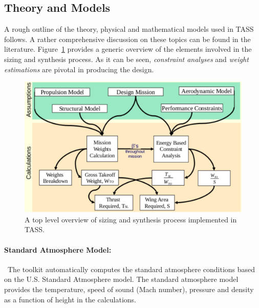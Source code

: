\documentclass[pdftex,11pt,letter]{article}
\begin{document}
\subsection{Theory and Models}\label{theory}
A rough outline of the theory, physical and mathematical models used in TASS follows. A rather comprehensive discussion on these topics can be found in the literature\cite{MattinglyText,NicolaiText,FieldingText,HoweText,RaymerText}. Figure~\ref{fig:sizing_overview} provides a generic overview of the elements involved in the sizing and synthesis process. As it can be seen, \emph{constraint analyses} and \emph{weight estimations} are pivotal in producing the design.
\begin{figure}[h!]
	\centering
	\includegraphics[scale=0.85]{figures/sizing_overview.pdf}
	\caption{A top level overview of sizing and synthesis process implemented in TASS\cite{MavrisNotes}.}
	\label{fig:sizing_overview}
\end{figure}

\paragraph{Standard Atmosphere Model:}~The toolkit automatically computes the standard atmosphere conditions based on the U.S. Standard Atmosphere model\cite{US,sky}.  The standard atmosphere model provides the temperature, speed of sound (Mach number), pressure and density as a function of height in the calculations.
\end{document}
